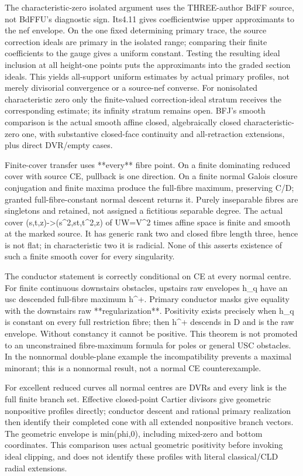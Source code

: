 \documentclass[11pt]{article}
\begin{document}
The characteristic-zero isolated argument uses the THREE-author BdFF source, not BdFFU's diagnostic sign. Its4.11 gives coefficientwise upper approximants to the nef envelope. On the one fixed determining primary trace, the source correction ideals are primary in the isolated range; comparing their finite coefficients to the gauge gives a uniform constant. Testing the resulting ideal inclusion at all height-one points puts the approximants into the graded section ideals. This yields all-support uniform estimates by actual primary profiles, not merely divisorial convergence or a source-nef converse. For nonisolated characteristic zero only the finite-valued correction-ideal stratum receives the corresponding estimate; its infinity stratum remains open. BFJ's smooth comparison is the actual smooth affine closed, algebraically closed characteristic-zero one, with substantive closed-face continuity and all-retraction extensions, plus direct DVR/empty cases.

Finite-cover transfer uses **every** fibre point. On a finite dominating reduced cover with source CE, pullback is one direction. On a finite normal Galois closure conjugation and finite maxima produce the full-fibre maximum, preserving C/D; granted full-fibre-constant normal descent returns it. Purely inseparable fibres are singletons and retained, not assigned a fictitious separable degree. The actual cover (s,t,z)->(s\textasciicircum{}2,st,t\textasciicircum{}2,z) of UW=V\textasciicircum{}2 times affine space is finite and smooth at the marked source. It has generic rank two and closed fibre length three, hence is not flat; in characteristic two it is radicial. None of this asserts existence of such a finite smooth cover for every singularity.

The conductor statement is correctly conditional on CE at every normal centre. For finite continuous downstairs obstacles, upstairs raw envelopes h\_q have an usc descended full-fibre maximum h\textasciicircum{}+. Primary conductor masks give equality with the downstairs raw **regularization**. Positivity exists precisely when h\_q is constant on every full restriction fibre; then h\textasciicircum{}+ descends in D and is the raw envelope. Without constancy it cannot be positive. This theorem is not promoted to an unconstrained fibre-maximum formula for poles or general USC obstacles. In the nonnormal double-plane example the incompatibility prevents a maximal minorant; this is a nonnormal result, not a normal CE counterexample.

For excellent reduced curves all normal centres are DVRs and every link is the full finite branch set. Effective closed-point Cartier divisors give geometric nonpositive profiles directly; conductor descent and rational primary realization then identify their completed cone with all extended nonpositive branch vectors. The geometric envelope is min(phi,0), including mixed-zero and bottom coordinates. This comparison uses actual geometric positivity before invoking ideal clipping, and does not identify these profiles with literal classical/CLD radial extensions.
\end{document}
